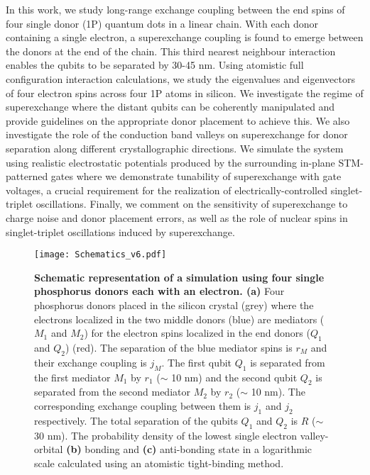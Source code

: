 \documentclass[%
showkeys,
 amsmath,amssymb,
 aps,
prb,
]{revtex4-2}
\begin{document}
In this work, we study long-range exchange coupling between the end spins of four single donor (1P) quantum dots in a linear chain. With each donor containing a single electron, a superexchange coupling is found to emerge between the donors at the end of the chain. This third nearest neighbour interaction enables the qubits to be separated by 30-45 nm. Using atomistic full configuration interaction calculations, we study the eigenvalues and eigenvectors of four electron spins across four 1P atoms in silicon. We investigate the regime of superexchange where the distant qubits can be coherently manipulated and provide guidelines on the appropriate donor placement to achieve this. We also investigate the role of the conduction band valleys on superexchange for donor separation along different crystallographic directions. We simulate the system using realistic electrostatic potentials produced by the surrounding in-plane STM-patterned gates where we demonstrate tunability of superexchange with gate voltages, a crucial requirement for the realization of electrically-controlled singlet-triplet oscillations. Finally, we comment on the sensitivity of superexchange to charge noise and donor placement errors, as well as the role of nuclear spins in singlet-triplet oscillations induced by superexchange.

\begin{figure*}[htb!]
    \centering
    \texttt{[image: Schematics\_v6.pdf]}
    \caption{\textbf{Schematic representation of a simulation using four single phosphorus donors each with an electron. (a)} Four phosphorus donors placed in the silicon crystal (grey) where the electrons localized in the two middle donors (blue) are mediators ($M_1$ and $M_2$) for the electron spins localized in the end donors ($Q_1$ and $Q_2$) (red). The separation of the blue mediator spins is $r_M$ and their exchange coupling is $j_M$. The first qubit $Q_1$ is separated from the first mediator $M_1$ by $r_1$ ($\sim$ 10 nm) and the second qubit $Q_2$ is separated from the second mediator $M_2$ by $r_2$ ($\sim$ 10 nm). The corresponding exchange coupling between them is $j_1$ and $j_2$ respectively. The total separation of the qubits $Q_1$ and $Q_2$ is $R$ ($\sim$ 30 nm). 
    The probability density of the lowest single electron valley-orbital \textbf{(b)} bonding and \textbf{(c)} anti-bonding state in a logarithmic scale calculated using an atomistic tight-binding method.}
    \label{fig:schematics}
\end{figure*}
\end{document}
